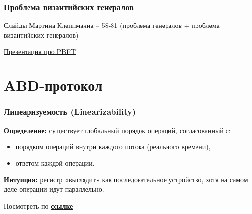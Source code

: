 \documentclass{beamer}
\begin{document}
\begin{frame}
\frametitle{Проблема византийских генералов}

Слайды Мартина Клеппманна – 58-81 (проблема генералов + проблема византийских генералов)

\vspace{0.6cm}

\href{https://courses.cs.washington.edu/courses/cse452/20wi/slides/l15-bft.pdf}{Презентация про PBFT}


\end{frame}

\section{ABD-протокол}

\begin{frame}
\frametitle{Линеаризуемость (Linearizability)}

\textbf{Определение:} существует глобальный порядок операций, согласованный с:
\begin{itemize}
  \item порядком операций внутри каждого потока (реального времени),
  \item ответом каждой операции.
\end{itemize}

\vspace{0.3em}
\small \textbf{Интуиция:} регистр «выглядит» как последовательное устройство, хотя на самом деле операции идут параллельно.

\vspace{0.6em}

Посмотреть по {\bfseries \href{https://eli.thegreenplace.net/2024/linearizability-in-distributed-systems/}{ссылке}}

\end{frame}
\end{document}
